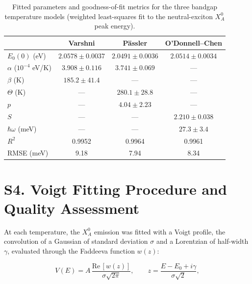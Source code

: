 \documentclass[letterpaper]{article}
\DeclareRobustCommand{\rev}[1]{#1}
\begin{document}
\begin{table}[H]
  \centering
  \caption{Fitted parameters and goodness-of-fit metrics for the three
    bandgap temperature models (weighted least-squares fit to the
    neutral-exciton $X_A^0$ peak energy).}
  \label{tab:s1}
  \begin{tabular*}{\linewidth}{@{\extracolsep{\fill}}lccc}
    \toprule
     & Varshni & Pässler & O'Donnell--Chen \\
    \midrule
    $E_0(0)$ (eV)             & $2.0578 \pm 0.0037$ & $2.0491 \pm 0.0036$ & $2.0514 \pm 0.0034$ \\
    $\alpha$ ($10^{-4}$ eV/K) & $3.908 \pm 0.116$   & $3.741 \pm 0.069$   & --- \\
    $\beta$ (K)               & $185.2 \pm 41.4$    & ---                 & --- \\
    $\Theta$ (K)              & ---                 & $280.1 \pm 28.8$    & --- \\
    $p$                       & ---                 & $4.04 \pm 2.23$     & --- \\
    $S$                       & ---                 & ---                 & $2.210 \pm 0.038$ \\
    $\hbar\omega$ (meV)       & ---                 & ---                 & $27.3 \pm 3.4$ \\
    \midrule
    $R^2$                     & 0.9952              & 0.9964              & 0.9961 \\
    RMSE (meV)                & 9.18                & 7.94                & 8.34 \\
    \bottomrule
  \end{tabular*}
\end{table}

\section*{S4. Voigt Fitting Procedure and Quality Assessment}

\rev{At each temperature, the $X_A^0$ emission was fitted with a Voigt profile,
the convolution of a Gaussian of standard deviation $\sigma$ and a Lorentzian of
half-width $\gamma$, evaluated through the Faddeeva function $w(z)$:}

\begin{equation}
\label{eq:voigt}
V(E) = A\,\frac{\mathrm{Re}\,[w(z)]}{\sigma\sqrt{2\pi}}, \qquad
z = \frac{E - E_0 + i\gamma}{\sigma\sqrt{2}},
\end{equation}
\end{document}
